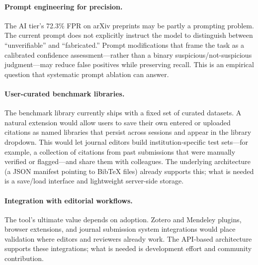 \paragraph{Prompt engineering for precision.} The AI tier's 72.3\% FPR on arXiv preprints may be partly a prompting problem. The current prompt does not explicitly instruct the model to distinguish between ``unverifiable'' and ``fabricated.'' Prompt modifications that frame the task as a calibrated confidence assessment---rather than a binary suspicious/not-suspicious judgment---may reduce false positives while preserving recall. This is an empirical question that systematic prompt ablation can answer.

\paragraph{User-curated benchmark libraries.} The benchmark library currently ships with a fixed set of curated datasets. A natural extension would allow users to save their own entered or uploaded citations as named libraries that persist across sessions and appear in the library dropdown. This would let journal editors build institution-specific test sets---for example, a collection of citations from past submissions that were manually verified or flagged---and share them with colleagues. The underlying architecture (a JSON manifest pointing to BibTeX files) already supports this; what is needed is a save/load interface and lightweight server-side storage.

\paragraph{Integration with editorial workflows.} The tool's ultimate value depends on adoption. Zotero and Mendeley plugins, browser extensions, and journal submission system integrations would place validation where editors and reviewers already work. The API-based architecture supports these integrations; what is needed is development effort and community contribution.
